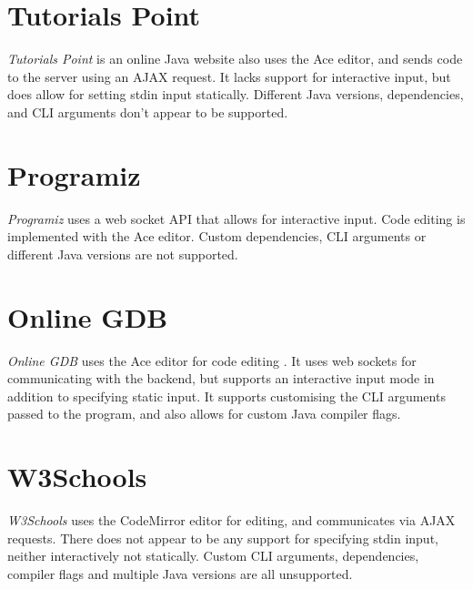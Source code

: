 
\section{Tutorials Point}

\emph{Tutorials Point} \cite{tutorials-point-2022} is an online Java website also uses the Ace editor, and sends code to the server using an AJAX request. It lacks support for interactive input, but does allow for setting stdin input statically. Different Java versions, dependencies, and CLI arguments don't appear to be supported.


\section{Programiz}

\emph{Programiz} \cite{programiz-2022} uses a web socket API that allows for interactive input. Code editing is implemented with the Ace editor. Custom dependencies, CLI arguments or different Java versions are not supported.


\section{Online GDB}

\emph{Online GDB} uses the Ace editor for code editing \cite{gdb-online-2022}. It uses web sockets for communicating with the backend, but supports an interactive input mode in addition to specifying static input. It supports customising the CLI arguments passed to the program, and also allows for custom Java compiler flags.


\section{W3Schools}

\emph{W3Schools} \cite{w3schools-2022} uses the CodeMirror editor for editing, and communicates via AJAX requests. There does not appear to be any support for specifying stdin input, neither interactively not statically. Custom CLI arguments, dependencies, compiler flags and multiple Java versions are all unsupported.


